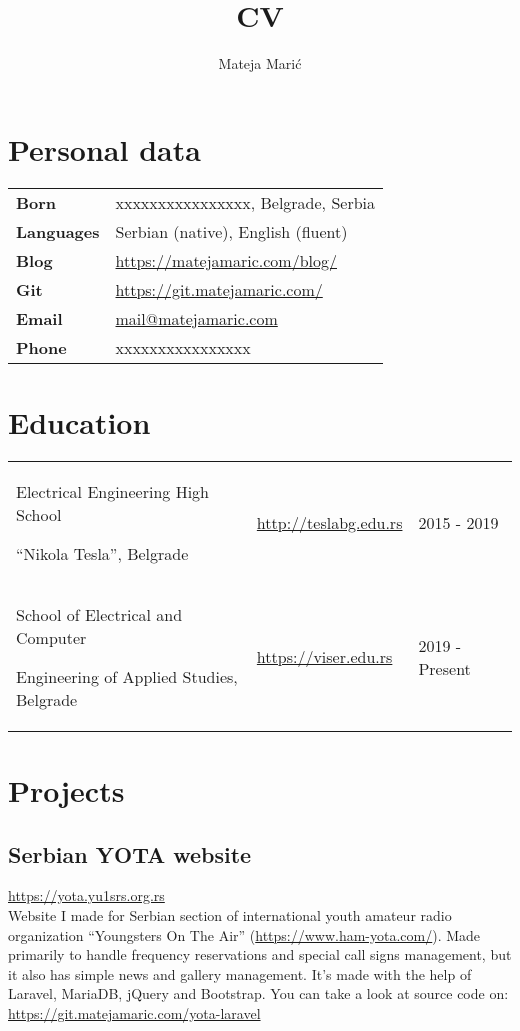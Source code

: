 \documentclass[12pt]{article}
\title{CV}
\author{Mateja Mari\'c}
\renewcommand{\maketitle}{
\begin{flushleft}
\huge\bfseries
\theauthor \hfill \thetitle
\normalsize\mdseries
\end{flushleft}
}
\begin{document}
\maketitle
\vspace{0.1em}

\section{Personal data}
\begin{tabular}{ @{} l l }
\large\textbf{Born}       & \normalsize xxxxxxxxxxxxxxxx, Belgrade, Serbia\\
\large\textbf{Languages}  & \normalsize Serbian (native), English (fluent)\\
\large\textbf{Blog}       & \normalsize \url{https://matejamaric.com/blog/}\\
\large\textbf{Git}        & \normalsize \url{https://git.matejamaric.com/}\\
\large\textbf{Email}      & \normalsize \url{mail@matejamaric.com}\\
\large\textbf{Phone}      & \normalsize xxxxxxxxxxxxxxxx
\end{tabular}

\section{Education}
\begin{tabular}{ @{} p{3in} l l }
Electrical Engineering High School 

``Nikola Tesla'', Belgrade              & \url{http://teslabg.edu.rs}  & 2015 - 2019\\
School of Electrical and Computer 

Engineering of Applied Studies, Belgrade & \url{https://viser.edu.rs}   & 2019 - Present
\end{tabular}

\section{Projects}
\subsection{Serbian YOTA website}
\hfill\url{https://yota.yu1srs.org.rs}\\
Website I made for Serbian section of international youth amateur radio organization ``Youngsters On The Air'' (\url{https://www.ham-yota.com/}). 
Made primarily to handle frequency reservations and special call signs management, 
but it also has simple news and gallery management.
It's made with the help of Laravel, MariaDB, jQuery and Bootstrap. 
You can take a look at source code on: \url{https://git.matejamaric.com/yota-laravel}
\\
\end{document}
